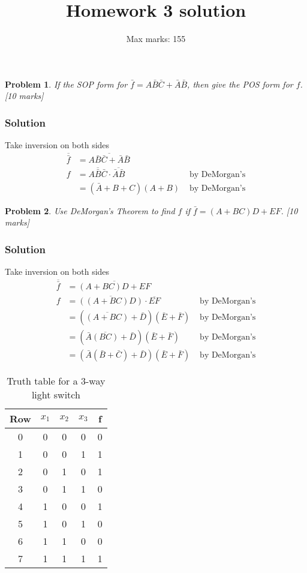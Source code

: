 \documentclass[twocolumn]{article}
\title{Homework 3  solution}
\author{Max marks: 155}
\newtheorem{prob}{Problem}
\newcommand{\bA}{\bar{A}}
\newcommand{\bB}{\bar{B}}
\newcommand{\bC}{\bar{C}}
\begin{document}
\maketitle

\begin{prob}
If the SOP form for $ \bar{f} = A\bB\bC+\bA\bB$, then give the POS form for
$f$. [10 marks]
\end{prob}
\subsubsection*{Solution}

Take inversion on both sides
\begin{align*}
  \overline{\bar{f}} &= \overline{A\bB\bC+\bA\bB} &
  \\
  f  &= \overline{A\bB\bC} \cdot \overline{\bA\bB} & \text{ by DeMorgan's}
  \\
    &= (\bA + B + C) (A + B) & \text{ by DeMorgan's}
\end{align*}

\begin{prob}
Use DeMorgan's Theorem to find $f$  if  $\bar{f} = (A + BC)D + EF$. [10 marks]
\end{prob}

\subsubsection*{Solution}
Take inversion on both sides
\begin{align*}
  \overline{\bar{f}} &= \overline{(A+BC)D + EF} &
  \\
  f  &= \overline{((A+BC)D)} \cdot \overline{EF} & \text{ by DeMorgan's}
  \\
  &= (\overline{(A+BC)} + \bar{D}) (\bar{E}+\bar{F}) & \text{ by DeMorgan's}
  \\
  &= (\bA\overline{(BC)} + \bar{D}) (\bar{E}+\bar{F}) & \text{ by DeMorgan's}
  \\
  &= (\bA(\bB + \bC) + \bar{D}) (\bar{E}+\bar{F}) & \text{ by DeMorgan's}
\end{align*}

\begin{table}
  \centering
  \begin{tabular}{c|ccc||c}
    \toprule
    Row & $x_1$ & $x_2$ & $x_3$ & f \\
    \midrule
    0 & 0 & 0 & 0 & 0 \\
    1 & 0 & 0 & 1 & 1 \\
    2 & 0 & 1 & 0 & 1 \\
    3 & 0 & 1 & 1 & 0 \\
    4 & 1 & 0 & 0 & 1 \\
    5 & 1 & 0 & 1 & 0 \\
    6 & 1 & 1 & 0 & 0 \\
    7 & 1 & 1 & 1 & 1 \\
    \bottomrule
    \end{tabular}
    \caption{Truth table for a 3-way light switch}
    \label{tab:3-way-light-switch}
\end{table}
\end{document}
